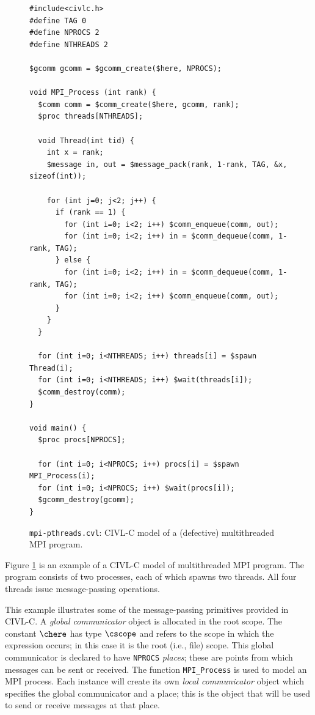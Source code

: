 \begin{figure}[t]
  \begin{small}
\begin{verbatim}
#include<civlc.h>
#define TAG 0
#define NPROCS 2
#define NTHREADS 2

$gcomm gcomm = $gcomm_create($here, NPROCS);

void MPI_Process (int rank) {
  $comm comm = $comm_create($here, gcomm, rank);
  $proc threads[NTHREADS];
  
  void Thread(int tid) {
    int x = rank;
    $message in, out = $message_pack(rank, 1-rank, TAG, &x, sizeof(int));
    
    for (int j=0; j<2; j++) {
      if (rank == 1) {
        for (int i=0; i<2; i++) $comm_enqueue(comm, out);
        for (int i=0; i<2; i++) in = $comm_dequeue(comm, 1-rank, TAG);
      } else {
        for (int i=0; i<2; i++) in = $comm_dequeue(comm, 1-rank, TAG);
        for (int i=0; i<2; i++) $comm_enqueue(comm, out);
      }
    }
  }
  
  for (int i=0; i<NTHREADS; i++) threads[i] = $spawn Thread(i);
  for (int i=0; i<NTHREADS; i++) $wait(threads[i]);
  $comm_destroy(comm);
}

void main() {
  $proc procs[NPROCS];

  for (int i=0; i<NPROCS; i++) procs[i] = $spawn MPI_Process(i);
  for (int i=0; i<NPROCS; i++) $wait(procs[i]);
  $gcomm_destroy(gcomm);
}
\end{verbatim}
  \end{small}
  \caption{\texttt{mpi-pthreads.cvl}: CIVL-C model of a (defective)
    multithreaded MPI program.}
  \label{fig:mpithreads}
\end{figure}

Figure \ref{fig:mpithreads} is an example of a CIVL-C model of
multithreaded MPI program.  The program consists of two processes,
each of which spawns two threads.  All four threads issue
message-passing operations.

This example illustrates some of the message-passing primitives
provided in CIVL-C.  A \emph{global communicator} object is allocated
in the root scope.  The constant $\chere$ has type $\cscope$ and
refers to the scope in which the expression occurs; in this case it is
the root (i.e., file) scope.  This global communicator is declared to
have \texttt{NPROCS} \emph{places}; these are points from which
messages can be sent or received.  The function \verb!MPI_Process!  is
used to model an MPI process.  Each instance will create its own
\emph{local communicator} object which specifies the global
communicator and a place; this is the object that will be used to send
or receive messages at that place.

